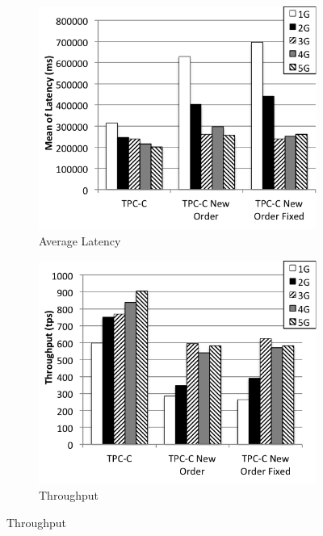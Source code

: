 \begin{figure}
    \centering
    \begin{subfigure}[t]{0.24\textwidth}
        \includegraphics[width=\textwidth]{plots/buffer_pool_size/latency}
        \caption{Average Latency}
        \label{fig:buf-size-mean}
    \end{subfigure}
    \begin{subfigure}[t]{0.24\textwidth}
        \includegraphics[width=\textwidth]{plots/buffer_pool_size/throughput}
        \caption{Throughput}
        \label{fig:buf-size-throughput}
    \end{subfigure}

\end{figure}
